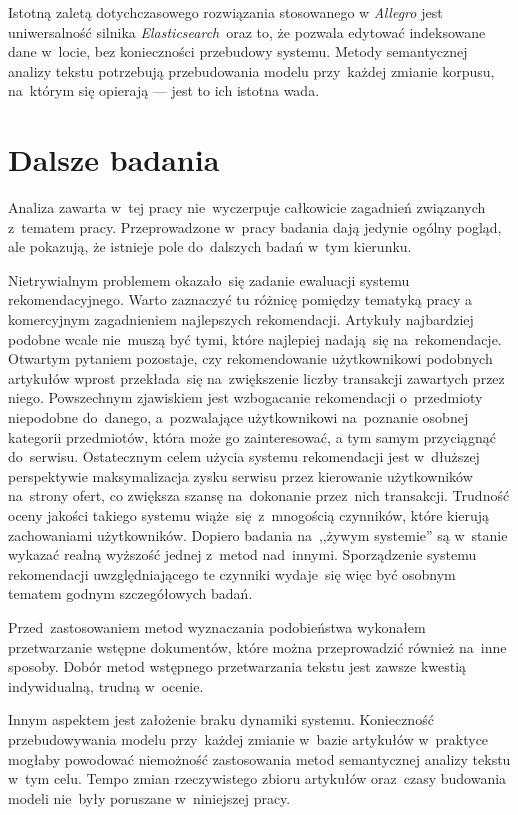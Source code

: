 \documentclass[pl]{minipw} %
\begin{document}
Istotną zaletą dotychczasowego rozwiązania stosowanego w \textit{Allegro} jest uniwersalność silnika \textit{Elasticsearch}~oraz to, że pozwala edytować indeksowane dane w~locie, bez konieczności przebudowy systemu. Metody semantycznej analizy tekstu potrzebują przebudowania modelu przy~każdej zmianie korpusu, na~którym się opierają --- jest to ich istotna wada.


\section{Dalsze badania}

Analiza zawarta w~tej pracy nie~wyczerpuje całkowicie zagadnień związanych z~tematem pracy. Przeprowadzone w~pracy badania dają jedynie ogólny pogląd, ale pokazują, że istnieje pole do~dalszych badań w~tym kierunku.

Nietrywialnym problemem okazało~się zadanie ewaluacji systemu rekomendacyjnego. Warto zaznaczyć tu różnicę pomiędzy tematyką pracy a komercyjnym zagadnieniem najlepszych rekomendacji. Artykuły najbardziej podobne wcale nie~muszą być tymi, które najlepiej nadają~się na~rekomendacje. Otwartym pytaniem pozostaje, czy rekomendowanie użytkownikowi podobnych artykułów wprost przekłada~się na~zwiększenie liczby transakcji zawartych przez niego. Powszechnym zjawiskiem jest wzbogacanie rekomendacji o~przedmioty niepodobne do~danego, a~pozwalające użytkownikowi na~poznanie osobnej kategorii przedmiotów, która może go zainteresować, a tym samym przyciągnąć do~serwisu. Ostatecznym celem użycia systemu rekomendacji jest w~dłuższej perspektywie maksymalizacja zysku serwisu przez kierowanie użytkowników na~strony ofert, co zwiększa szansę na~dokonanie przez~nich transakcji. Trudność oceny jakości takiego systemu wiąże~się z~mnogością czynników, które kierują zachowaniami użytkowników. Dopiero badania na~,,żywym systemie'' są w~stanie wykazać realną wyższość jednej z~metod nad~innymi. Sporządzenie systemu rekomendacji uwzględniającego te czynniki wydaje~się więc być osobnym tematem godnym szczegółowych badań.

Przed~zastosowaniem metod wyznaczania podobieństwa wykonałem przetwarzanie wstępne dokumentów, które można przeprowadzić również na~inne sposoby. Dobór metod wstępnego przetwarzania tekstu jest zawsze kwestią indywidualną, trudną w~ocenie.

Innym aspektem jest założenie braku dynamiki systemu. Konieczność przebudowywania modelu przy~każdej zmianie w~bazie artykułów w~praktyce mogłaby powodować niemożność zastosowania metod semantycznej analizy tekstu w~tym celu. Tempo zmian rzeczywistego zbioru artykułów oraz~czasy budowania modeli nie~były poruszane w~niniejszej pracy.
\end{document}
